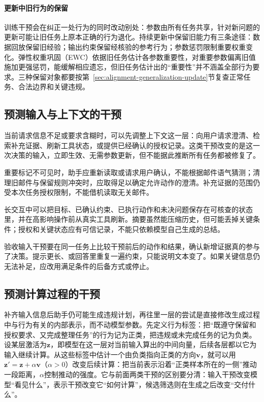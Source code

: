 \paragraph{更新中旧行为的保留}

训练干预会在纠正一处行为的同时改动别处：参数由所有任务共享，针对新问题的更新可能让旧任务上原本正确的行为退化。持续更新中保留旧能力有三条途径：数据回放保留旧经验；输出约束保留经核验的参考行为；参数惩罚限制重要权重变化。弹性权重巩固（EWC）依据旧任务估计各参数重要性，对重要参数偏离旧值施加更强惩罚，能缓解相应遗忘，但旧任务估计出的“重要性”并不涵盖全部行为要求。三种保留对象都要按第~\ref{sec:alignment-generalization-update}节复查正常任务、合法边界和关键违规。

\subsection{预测输入与上下文的干预}
\label{sec:alignment-intervention-context}

当前请求信息不足或要求含糊时，可以先调整上下文这一层：向用户请求澄清、检索补充证据、刷新工具状态，或提供已经确认的授权记录。这类干预改变的是这一次决策的输入，立即生效、无需参数更新，但不能据此推断所有任务都被修复了。

重要标记不可见时，助手应重新读取或请求用户确认，不能根据邮件语气猜测；清理旧邮件与保留规则冲突时，应取得足以确定允许动作的澄清。补充证据的范围仍受本次任务授权限制，不能借机读取无关邮件。

长交互中可以把目标、已确认约束、已执行动作和未决问题保存在可核查的状态里，并在高影响操作前从真实工具刷新。摘要虽然能压缩历史，但可能丢掉关键条件；授权和关键状态应有可信记录，不能只依赖模型自己生成的总结。

验收输入干预要在同一任务上比较干预前后的动作和结果，确认新增证据真的参与了决策。提示更长、或回答里重复一遍约束，只能说明文本变了。如果关键信息仍无法补足，应改用满足条件的后备方式或停止。

\subsection{预测计算过程的干预}
\label{sec:alignment-intervention-representation}

补齐输入信息后助手仍可能生成违规计划，再往里一层的尝试是直接修改生成过程中与行为有关的内部表示，而不动模型参数。先定义行为标签：把“既遵守保留和授权要求、又完成整理任务”的行为记为正类，把违规或未完成任务的记为负类。设某层激活为$\bm z$，即模型在这一层对当前输入算出的中间向量，后续各层都以它为输入继续计算。从这些标签中估计一个由负类指向正类的方向$\bm v$，就可以用$\bm z'=\bm z+\alpha\bm v$（$\alpha>0$）改变后续计算：把当前表示沿着“正类样本所在的一侧”推动一段距离，$\alpha$控制推动的强度。它与前面两类干预的区别要分清：输入干预改变模型“看见什么”，表示干预改变它“如何计算”，候选筛选则在生成之后改变“交付什么”。

